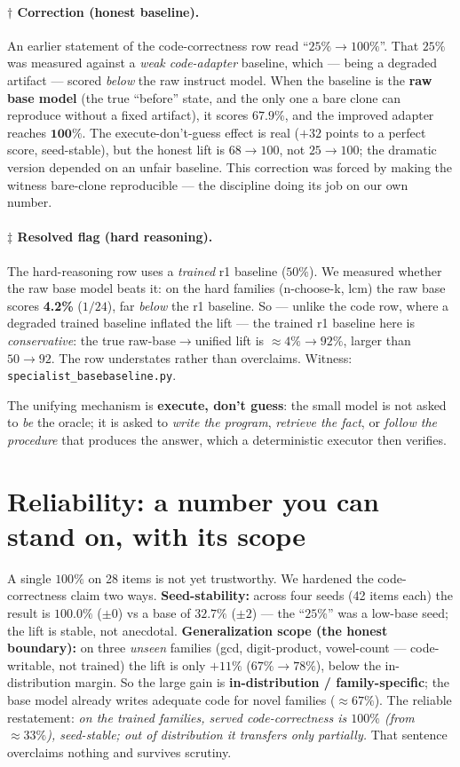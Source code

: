 \documentclass[11pt]{article}
\begin{document}
\paragraph{$\dagger$ Correction (honest baseline).} An earlier statement of the
code-correctness row read ``$25\%\!\to\!100\%$''. That $25\%$ was measured against a
\emph{weak code-adapter} baseline, which --- being a degraded artifact --- scored
\emph{below} the raw instruct model. When the baseline is the \textbf{raw base model}
(the true ``before'' state, and the only one a bare clone can reproduce without a
fixed artifact), it scores $\mathbf{67.9\%}$, and the improved adapter reaches
$\mathbf{100\%}$. The execute-don't-guess effect is real ($+32$ points to a perfect
score, seed-stable), but the honest lift is $68\!\to\!100$, not $25\!\to\!100$; the
dramatic version depended on an unfair baseline. This correction was forced by making
the witness bare-clone reproducible --- the discipline doing its job on our own
number.

\paragraph{$\ddagger$ Resolved flag (hard reasoning).} The hard-reasoning row uses a
\emph{trained} r1 baseline ($50\%$). We measured whether the raw base model beats it: on the
hard families (n-choose-k, lcm) the raw base scores \textbf{4.2\%} ($1/24$), far \emph{below}
the r1 baseline. So --- unlike the code row, where a degraded trained baseline inflated the
lift --- the trained r1 baseline here is \emph{conservative}: the true raw-base$\to$unified
lift is $\approx 4\%\!\to\!92\%$, larger than $50\!\to\!92$. The row understates rather than
overclaims. Witness: \texttt{specialist\_basebaseline.py}.

The unifying mechanism is \textbf{execute, don't guess}: the small model is not asked
to \emph{be} the oracle; it is asked to \emph{write the program}, \emph{retrieve the
fact}, or \emph{follow the procedure} that produces the answer, which a deterministic
executor then verifies.

\section{Reliability: a number you can stand on, with its scope}
A single $100\%$ on 28 items is not yet trustworthy. We hardened the code-correctness
claim two ways. \textbf{Seed-stability:} across four seeds (42 items each) the result
is $100.0\%$ ($\pm 0$) vs a base of $32.7\%$ ($\pm 2$) --- the ``$25\%$'' was a
low-base seed; the lift is stable, not anecdotal.
\textbf{Generalization scope (the honest boundary):} on three \emph{unseen} families
(gcd, digit-product, vowel-count --- code-writable, not trained) the lift is only
$+11\%$ ($67\%\!\to\!78\%$), below the in-distribution margin. So the large gain is
\textbf{in-distribution / family-specific}; the base model already writes adequate
code for novel families ($\approx 67\%$). The reliable restatement: \emph{on the
trained families, served code-correctness is $100\%$ (from $\approx 33\%$),
seed-stable; out of distribution it transfers only partially.} That sentence
overclaims nothing and survives scrutiny.
\end{document}
